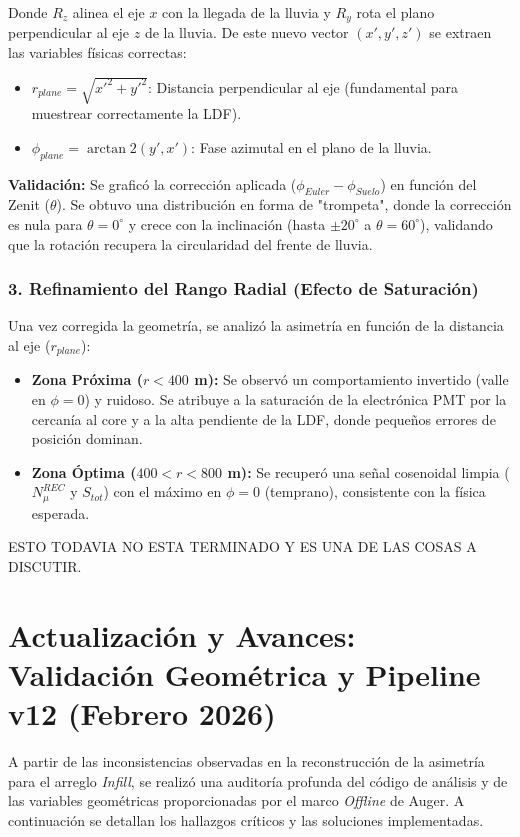 Donde $R_z$ alinea el eje $x$ con la llegada de la lluvia y $R_y$ rota el plano perpendicular al eje $z$ de la lluvia. De este nuevo vector $(x', y', z')$ se extraen las variables físicas correctas:
\begin{itemize}
	\item $r_{plane} = \sqrt{x'^2 + y'^2}$: Distancia perpendicular al eje (fundamental para muestrear correctamente la LDF).
	\item $\phi_{plane} = \arctan2(y', x')$: Fase azimutal en el plano de la lluvia.
\end{itemize}

\textbf{Validación:} Se graficó la corrección aplicada ($\phi_{Euler} - \phi_{Suelo}$) en función del Zenit ($\theta$). Se obtuvo una distribución en forma de "trompeta", donde la corrección es nula para $\theta=0^\circ$ y crece con la inclinación (hasta $\pm 20^\circ$ a $\theta=60^\circ$), validando que la rotación recupera la circularidad del frente de lluvia.

\subsubsection*{3. Refinamiento del Rango Radial (Efecto de Saturación)}
Una vez corregida la geometría, se analizó la asimetría en función de la distancia al eje ($r_{plane}$):
\begin{itemize}
	\item \textbf{Zona Próxima ($r < 400$ m):} Se observó un comportamiento invertido (valle en $\phi=0$) y ruidoso. Se atribuye a la saturación de la electrónica PMT por la cercanía al core y a la alta pendiente de la LDF, donde pequeños errores de posición dominan.
	\item \textbf{Zona Óptima ($400 < r < 800$ m):} Se recuperó una señal cosenoidal limpia ($N_{\mu}^{REC}$ y $S_{tot}$) con el máximo en $\phi=0$ (temprano), consistente con la física esperada.
\end{itemize}

ESTO TODAVIA NO ESTA TERMINADO Y ES UNA DE LAS COSAS A DISCUTIR.

\section*{Actualización y Avances: Validación Geométrica y Pipeline v12 (Febrero 2026)}

A partir de las inconsistencias observadas en la reconstrucción de la asimetría para el arreglo \textit{Infill}, se realizó una auditoría profunda del código de análisis y de las variables geométricas proporcionadas por el marco \textit{Offline} de Auger. A continuación se detallan los hallazgos críticos y las soluciones implementadas.

